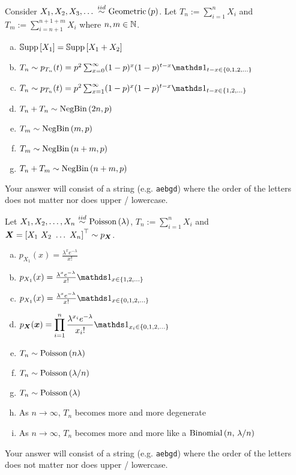 \documentclass[12pt,landscape]{article}
\newcommand{\instr}{\small Your answer will consist of a string (e.g. \texttt{aebgd}) where the order of the letters does not matter nor does upper / lowercase. \normalsize}
\begin{document}



\problem{} Consider $X_1, X_2, X_3, \ldots \iid \geometric{p}$. Let $T_n := \sum_{i=1}^n X_i$ and $T_m := \sum_{i=n+1}^{n+1+m} X_i$ where $n, m \in \mathbb{N}$.
\vspace{-0.2cm}\benum{} 

\begin{enumerate}[(a)]
\item $\mathbb{S}\text{upp}\left[X_1\right] = \mathbb{S}\text{upp}\left[X_1 + X_2\right]$
\item $T_n \sim p_{T_n}(t) = p^2 \sum_{x=0}^\infty (1-p)^x (1-p)^{t-x} \indic{t-x \in \braces{0,1,2,\ldots}}$
\item $T_n \sim p_{T_n}(t) = p^2 \sum_{x=1}^\infty (1-p)^x (1-p)^{t-x} \indic{t-x \in \braces{1,2,\ldots}}$
\item $T_n + T_n \sim \mathrm{NegBin}\left(2n, p\right)$
\item $T_m \sim \mathrm{NegBin}\left(m, p\right)$
\item $T_m \sim \mathrm{NegBin}\left(n+m, p\right)$
\item $T_n + T_m \sim \mathrm{NegBin}\left(n+m, p\right)$
\end{enumerate}
\eenum\instr\pagebreak



\problem{} Let $X_1, X_2, \ldots, X_n \iid \poisson{\lambda}$, $T_n := \sum_{i=1}^n X_i$ and $\boldsymbol{X} = \left[X_1 ~ X_2 ~ \ldots~ X_n\right]^\top \sim p_{\boldsymbol{X}}$.
\vspace{-0.2cm}\benum{} 

\begin{enumerate}[(a)]
\item $p_{X_1}(x) = \frac{\lambda^x e^{-\lambda}}{x!}$
\item $p_{X_1}(x) = \frac{\lambda^x e^{-\lambda}}{x!} \indic{x \in \braces{1,2, ...}}$
\item $p_{X_1}(x) = \frac{\lambda^x e^{-\lambda}}{x!} \indic{x \in \braces{0,1,2, ...}}$
\item $p_{\X}(\x) = \displaystyle\prod_{i=1}^n \displaystyle\frac{\lambda^{x_i} e^{-\lambda}}{x_i!} \indic{x_i \in \braces{0,1,2, ...}}$
\item $T_n \sim \mathrm{Poisson}\left(n\lambda\right)$
\item $T_n \sim \mathrm{Poisson}\left(\lambda / n\right)$
\item $T_n \sim \mathrm{Poisson}\left(\lambda\right)$
\item As $n \rightarrow \infty$, $T_n$ becomes more and more degenerate
\item As $n \rightarrow \infty$, $T_n$ becomes more and more like a $\mathrm{Binomial}\left(n,\,\lambda / n\right)$
\end{enumerate}
\eenum\instr\pagebreak
\end{document}
